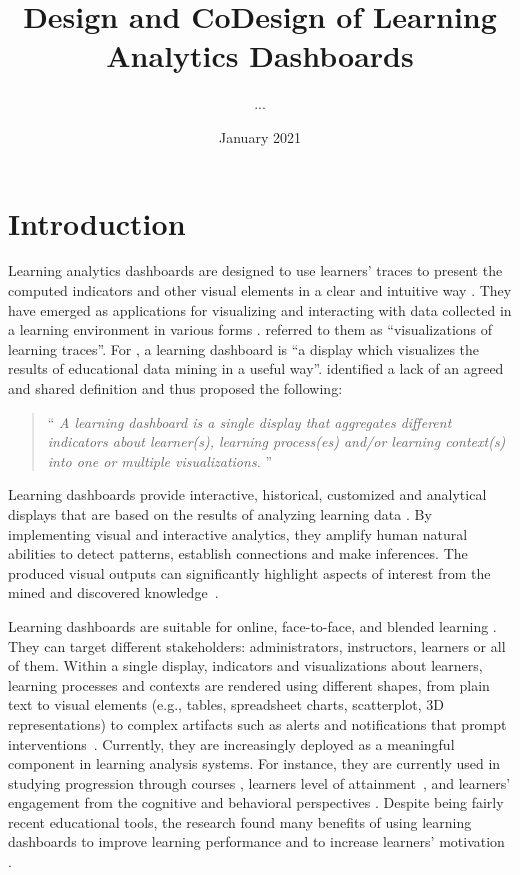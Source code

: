 \documentclass[preprint,12pt]{elsarticle}
\title{Design and CoDesign of Learning Analytics Dashboards}
\author{...}
\date{January 2021}
\begin{document}
\maketitle

\section{Introduction} 
Learning analytics dashboards are designed to use learners' traces to present the computed indicators and other visual elements in a clear and intuitive way \citep{Brouns2015}.
They have emerged as applications for visualizing and interacting with data collected in a learning environment in various forms \citep{Ramos2015}. \citet{Steiner2014} referred to them as ``visualizations of learning traces''. For \citet{Yoo2015}, a learning dashboard is ``a display which visualizes the results of educational data mining in a useful way''. 
\citet{Schwendimann2017} identified a lack of an agreed and shared definition and thus proposed the following:
\begin{quotation}
	``\textit{%
		A learning dashboard is a single display that aggregates different indicators
		about learner(s), learning process(es) and/or learning context(s) into one or
		multiple visualizations.
	}'' \citep{Schwendimann2017}
\end{quotation}
Learning dashboards provide interactive, historical, customized and analytical displays that are based on the results of  analyzing learning data \citep{Park2015, Kim2015}. By implementing visual and interactive analytics, they amplify human natural abilities to detect patterns, establish connections and make inferences. The produced visual outputs can significantly highlight aspects of interest from the mined and discovered knowledge~\citep{Duval2011}. 

Learning dashboards are suitable for online,  face-to-face, and blended learning \citep{Verbert2013}. They can target different stakeholders: administrators, instructors, learners or all of them. 
Within a single display, indicators and visualizations about learners, learning processes and contexts are rendered using different shapes, from plain text to visual elements (e.g., tables, spreadsheet charts, scatterplot, 3D representations) to complex artifacts such as alerts and notifications that prompt interventions~\citep{Few2006, Podgorelec2011, Schwendimann2017}. 
Currently, they are increasingly deployed as a meaningful component in learning analysis systems. For instance, they are currently used in studying progression through courses \citep{Nicholson2012}, learners level of attainment~\citep{Gutierrez2012}, and learners' engagement from the cognitive and behavioral perspectives \citep{Carrillo2017}.
Despite being fairly recent educational tools, the research found many benefits of using learning dashboards to improve learning performance \citep{Arnold2012} and to increase learners' motivation    \citep{Verbert2013, Wise2016}.
\end{document}
